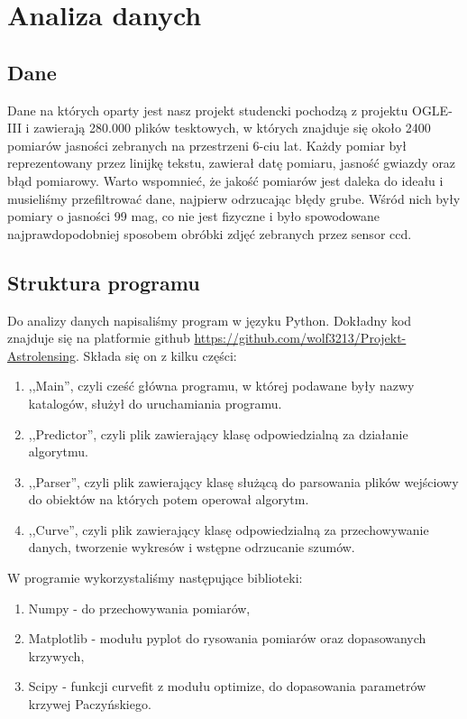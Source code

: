 \documentclass[a4paper,11pt]{article}
\newcommand{\ak}{\hspace{0.7 cm}}
\begin{document}
\section{Analiza danych}
\subsection{Dane}
\ak Dane na których oparty jest nasz projekt studencki pochodzą z projektu OGLE-III i zawierają 280.000 plików tesktowych, w których znajduje się około 2400 pomiarów jasności zebranych na przestrzeni 6-ciu lat. Każdy pomiar był reprezentowany przez linijkę tekstu, zawierał datę pomiaru, jasność gwiazdy oraz błąd pomiarowy. Warto wspomnieć, że jakość pomiarów jest daleka do ideału i musieliśmy przefiltrować dane, najpierw odrzucając błędy grube. Wśród nich były pomiary o jasności 99 mag, co nie jest fizyczne i było spowodowane najprawdopodobniej sposobem obróbki zdjęć zebranych przez sensor ccd.
\subsection{Struktura programu}
\ak Do analizy danych napisaliśmy program w języku Python. Dokładny kod znajduje się na platformie github \url{https://github.com/wolf3213/Projekt-Astrolensing}. Składa się on z kilku części:
\begin{enumerate}
\item ,,Main'', czyli cześć główna programu, w której podawane były nazwy katalogów, służył do uruchamiania programu.
\item ,,Predictor'', czyli plik zawierający klasę odpowiedzialną za działanie algorytmu.
\item ,,Parser'', czyli plik zawierający klasę służącą do parsowania plików wejściowy do obiektów na których potem operował algorytm.
\item ,,Curve'', czyli plik zawierający klasę odpowiedzialną za przechowywanie danych, tworzenie wykresów i wstępne odrzucanie szumów.
\end{enumerate} 
W programie wykorzystaliśmy następujące biblioteki:
\begin{enumerate}
	\item Numpy - do przechowywania pomiarów,
	\item Matplotlib - modułu pyplot do rysowania pomiarów oraz dopasowanych krzywych,
	\item Scipy - funkcji curve\textunderscore fit z modułu optimize, do dopasowania parametrów krzywej Paczyńskiego.
\end{enumerate}
\end{document}
